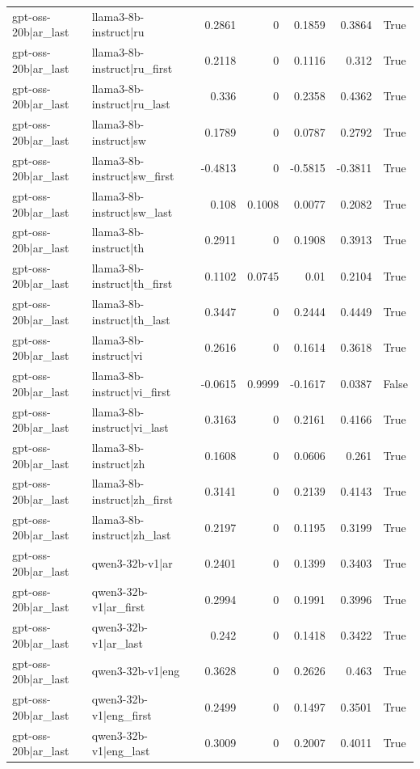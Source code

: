 \begin{table}
\begin{tabular}{l l r r r r l}
gpt-oss-20b|ar_last & llama3-8b-instruct|ru & 0.2861 & 0 & 0.1859 & 0.3864 & True \\
gpt-oss-20b|ar_last & llama3-8b-instruct|ru_first & 0.2118 & 0 & 0.1116 & 0.312 & True \\
gpt-oss-20b|ar_last & llama3-8b-instruct|ru_last & 0.336 & 0 & 0.2358 & 0.4362 & True \\
gpt-oss-20b|ar_last & llama3-8b-instruct|sw & 0.1789 & 0 & 0.0787 & 0.2792 & True \\
gpt-oss-20b|ar_last & llama3-8b-instruct|sw_first & -0.4813 & 0 & -0.5815 & -0.3811 & True \\
gpt-oss-20b|ar_last & llama3-8b-instruct|sw_last & 0.108 & 0.1008 & 0.0077 & 0.2082 & True \\
gpt-oss-20b|ar_last & llama3-8b-instruct|th & 0.2911 & 0 & 0.1908 & 0.3913 & True \\
gpt-oss-20b|ar_last & llama3-8b-instruct|th_first & 0.1102 & 0.0745 & 0.01 & 0.2104 & True \\
gpt-oss-20b|ar_last & llama3-8b-instruct|th_last & 0.3447 & 0 & 0.2444 & 0.4449 & True \\
gpt-oss-20b|ar_last & llama3-8b-instruct|vi & 0.2616 & 0 & 0.1614 & 0.3618 & True \\
gpt-oss-20b|ar_last & llama3-8b-instruct|vi_first & -0.0615 & 0.9999 & -0.1617 & 0.0387 & False \\
gpt-oss-20b|ar_last & llama3-8b-instruct|vi_last & 0.3163 & 0 & 0.2161 & 0.4166 & True \\
gpt-oss-20b|ar_last & llama3-8b-instruct|zh & 0.1608 & 0 & 0.0606 & 0.261 & True \\
gpt-oss-20b|ar_last & llama3-8b-instruct|zh_first & 0.3141 & 0 & 0.2139 & 0.4143 & True \\
gpt-oss-20b|ar_last & llama3-8b-instruct|zh_last & 0.2197 & 0 & 0.1195 & 0.3199 & True \\
gpt-oss-20b|ar_last & qwen3-32b-v1|ar & 0.2401 & 0 & 0.1399 & 0.3403 & True \\
gpt-oss-20b|ar_last & qwen3-32b-v1|ar_first & 0.2994 & 0 & 0.1991 & 0.3996 & True \\
gpt-oss-20b|ar_last & qwen3-32b-v1|ar_last & 0.242 & 0 & 0.1418 & 0.3422 & True \\
gpt-oss-20b|ar_last & qwen3-32b-v1|eng & 0.3628 & 0 & 0.2626 & 0.463 & True \\
gpt-oss-20b|ar_last & qwen3-32b-v1|eng_first & 0.2499 & 0 & 0.1497 & 0.3501 & True \\
gpt-oss-20b|ar_last & qwen3-32b-v1|eng_last & 0.3009 & 0 & 0.2007 & 0.4011 & True \\

\end{tabular}
\end{table}
